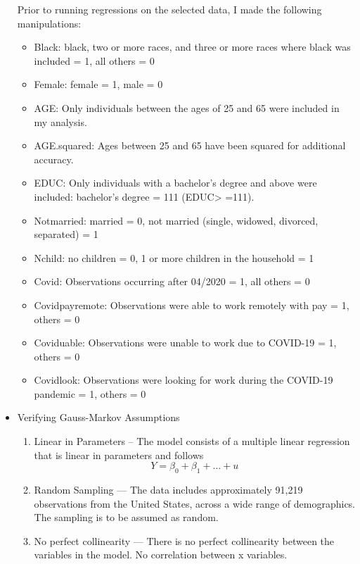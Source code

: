 \documentclass[12pt, english]{article}
\begin{document}
\begin{itemize}
    Prior to running regressions on the selected data, I made the following manipulations:
        \begin{itemize}
            \item Black: black, two or more races, and three or more races where black was included = 1, all others = 0 
            \item Female: female = 1, male = 0
            \item AGE: Only individuals between the ages of 25 and 65 were included in my analysis.
            \item AGE.squared: Ages between 25 and 65 have been squared for additional accuracy.
            \item EDUC: Only individuals with a bachelor’s degree and above were included: bachelor’s degree = 111 (EDUC> =111).
            \item Notmarried: married = 0, not married (single, widowed, divorced, separated) = 1
            \item Nchild: no children = 0, 1 or more children in the household = 1
            \item Covid: Observations occurring after 04/2020 = 1, all others = 0
            \item Covidpayremote: Observations were able to work remotely with pay = 1, others = 0
            \item Coviduable: Observations were unable to work due to COVID-19 = 1, others = 0
            \item Covidlook: Observations were looking for work during the COVID-19 pandemic = 1, others = 0
        \end{itemize}
    \item Verifying Gauss-Markov Assumptions
    \begin{enumerate}
        \item Linear in Parameters – The model consists of a multiple linear regression that is linear in parameters and follows 
            \begin{equation}
                Y = \beta_0 + \beta_1 + ... + u
            \end{equation}
        \item Random Sampling — The data includes approximately 91,219 observations from the United States, across a wide range of demographics. The sampling is to be assumed as random.
        \item No perfect collinearity — There is no perfect collinearity between the variables in the model. No correlation between x variables.

\end{enumerate}
\end{itemize}
\end{document}
